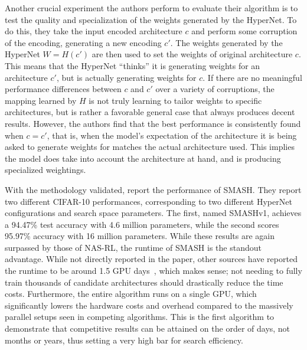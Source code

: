 Another crucial experiment the authors perform to evaluate their algorithm is to test the quality and specialization of
the weights generated by the HyperNet. To do this, they take the input encoded architecture $c$ and perform some corruption
of the encoding, generating a new encoding $c'$. The weights generated by the HyperNet $W=H(c')$ are then used to set the
weights of original architecture $c$. This means that the HyperNet ``thinks'' it is generating weights for an architecture
$c'$, but is actually generating weights for $c$. If there are no meaningful performance differences between $c$ and $c'$
over a variety of corruptions, the mapping learned by $H$ is not truly learning to tailor weights to specific architectures,
but is rather a favorable general case that always produces decent results. However, the authors find that the best performance
is consistently found when $c=c'$, that is, when the model's expectation of the architecture it is being asked
to generate weights for matches the actual architecture used. This implies the model does take into account the architecture
at hand, and is producing specialized weightings.

With the methodology validated, \citeauthor{brock2017} report the performance of SMASH. They report two different CIFAR-10
performances, corresponding to two different HyperNet configurations and search space parameters. The first, named SMASHv1,
achieves a 94.47\% test accuracy with 4.6 million parameters, while the second scores 95.97\% accuracy with 16 million parameters.
While these results are again surpassed by those of NAS-RL, the runtime of SMASH is the standout advantage. While not directly
reported in the paper, other sources have reported the runtime to be around 1.5 GPU days~\citep{ren2020}, which makes sense;
not needing to fully train thousands of candidate architectures should drastically reduce the time costs.
Furthermore, the entire algorithm runs on a single GPU, which significantly lowers the hardware costs and overhead compared
to the massively parallel setups seen in competing algorithms. This is the first algorithm to demonstrate that competitive
results can be attained on the order of days, not months or years, thus setting a very high bar for search efficiency.

